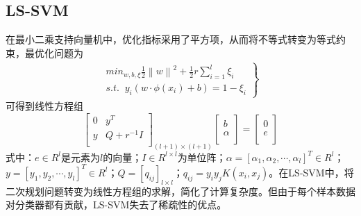 \documentclass[UTF8]{ctexart}
\begin{document}
\subsection*{LS-SVM}
\par 在最小二乘支持向量机中，优化指标采用了平方项，从而将不等式转变为等式约束，最优化问题为
\begin{eqnarray}     
\left.            
\begin{array}{ccc}     
min_{w,b,\xi }\frac{1}{2}\left \| w \right \|^{2} +\frac{1}{2}r \sum_{i=1}^{l}\xi _{i} \\
s.t.\; \; y_{i}(w\cdot \phi (x_{i})+b) = 1 -\xi _{i}
\end{array}          
\right\}         
\end{eqnarray} 
可得到线性方程组
\begin{equation}       
\left[                
  \begin{array}{ccc}   
    0 & y^{T}\\  
    y & Q+r^{-1}I\\  
  \end{array}
\right]_{(l+1)\times(l+1)}
\left[                
  \begin{array}{ccc}   
    b\\  
    \alpha\\  
  \end{array}
\right]=
\left[                
  \begin{array}{ccc}   
    0\\  
    e\\  
  \end{array}
\right]                
\end{equation}
式中：$e\in R^{l}$是元素为$l$的向量；$I\in R^{l\times l}$为单位阵；$\alpha=[\alpha_{1},\alpha_{2},\cdots ,\alpha_{l}]^{T}\in R^{l}$；$y=[y_{1},y_{2},\cdots ,y_{l}]^{T}\in R^{l}$；$Q=[q_{ij}]_{l\times l}$；$q_{ij}=y_{i}y_{j}K(x_{i},x_{j})$。在LS-SVM中，将二次规划问题转变为线性方程组的求解，简化了计算复杂度。但由于每个样本数据对分类器都有贡献，LS-SVM失去了稀疏性的优点。
\end{document}

